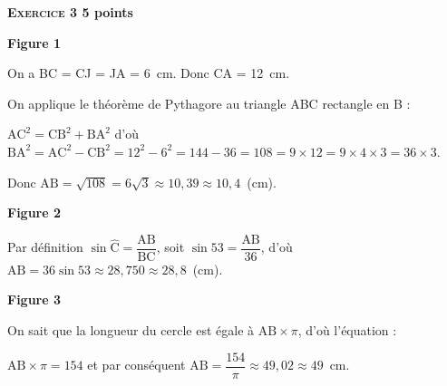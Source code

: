 \textbf{\textsc{Exercice 3} \hfill 5 points}

\medskip

\textbf{Figure 1}

On a BC = CJ = JA = 6~cm. Donc CA = 12~cm.

On applique le théorème de Pythagore au triangle ABC rectangle en B :

$\text{AC}^2 = \text{CB}^2 + \text{BA}^2$ d'où $\text{BA}^2 = \text{AC}^2 - \text{CB}^2 = 12^2 - 6^2  = 144 - 36 = 108 = 9 \times 12 = 9 \times 4 \times 3 = 36 \times 3$.

Donc $\text{AB} = \sqrt{108} = 6\sqrt{3} \approx 10,39\approx 10,4$~(cm).

\textbf{Figure 2}

Par définition $\sin \widehat{\text{C}} = \dfrac{\text{AB}}{\text{BC}}$, soit $\sin 53= \dfrac{\text{AB}}{36}$, d'où $\text{AB} = 36 \sin 53 \approx 28,750 \approx 28,8$~(cm).

\textbf{Figure 3}

On sait que la longueur du cercle est égale à $\text{AB} \times \pi$, d'où l'équation :

$\text{AB} \times \pi = 154$ et par conséquent $\text{AB} = \dfrac{154}{\pi} \approx 49,02 \approx 49$~cm.

\bigskip

